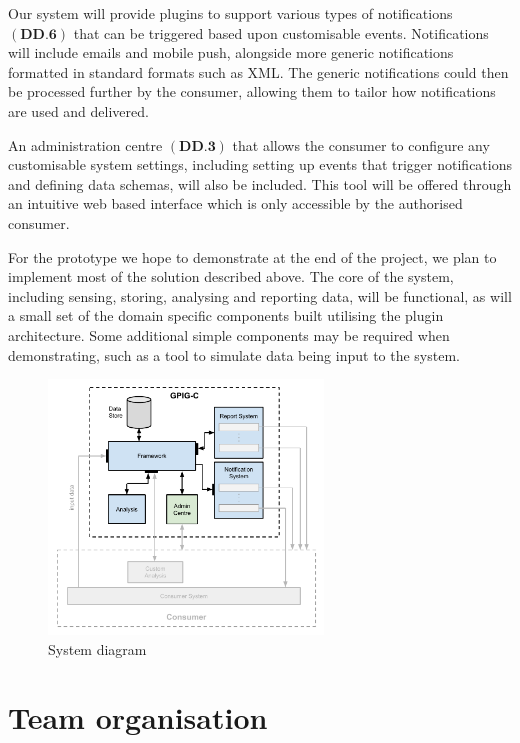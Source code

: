 \documentclass[10pt,a4paper]{article}
\begin{document}
Our system will provide plugins to support various types of notifications 
$(\textbf{DD.6})$ that can be triggered based upon customisable events. 
Notifications will include emails and mobile push, alongside more generic notifications formatted 
in standard formats such as XML. The generic notifications 
could then be processed further by the consumer, allowing them to tailor how 
notifications are used and delivered. 

An administration centre $(\textbf{DD.3})$ that allows
the consumer to configure any customisable system settings, including setting up
events that trigger notifications and defining data schemas, will also be included. This tool 
will be offered through an intuitive web based interface which is only accessible by the
authorised consumer. 

For the prototype we hope to demonstrate at the end of the project, we plan to
implement most of the solution described above. The core of the system,
including sensing, storing, analysing and reporting data, will be functional,
as will a small set of the domain specific components built utilising the plugin 
architecture. Some additional simple components may be required when 
demonstrating, such as a tool to simulate data being input to the system. 



\begin{figure}[hptb]
	\centering
	\includegraphics[width=0.65\textwidth]{system-architecture.pdf}
	\caption{System diagram}
	\label{fig:systemDiagram}
\end{figure}


\section{Team organisation}
\end{document}
